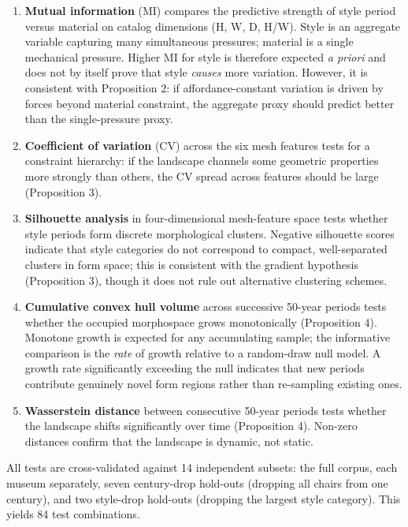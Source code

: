 \begin{enumerate}
\item \textbf{Mutual information} (MI) compares the predictive strength of style period versus material on catalog dimensions (H, W, D, H/W). Style is an aggregate variable capturing many simultaneous pressures; material is a single mechanical pressure. Higher MI for style is therefore expected \textit{a priori} and does not by itself prove that style \textit{causes} more variation. However, it is consistent with Proposition 2: if affordance-constant variation is driven by forces beyond material constraint, the aggregate proxy should predict better than the single-pressure proxy.

\item \textbf{Coefficient of variation} (CV) across the six mesh features tests for a constraint hierarchy: if the landscape channels some geometric properties more strongly than others, the CV spread across features should be large (Proposition 3).

\item \textbf{Silhouette analysis} in four-dimensional mesh-feature space tests whether style periods form discrete morphological clusters. Negative silhouette scores indicate that style categories do not correspond to compact, well-separated clusters in form space; this is consistent with the gradient hypothesis (Proposition 3), though it does not rule out alternative clustering schemes.

\item \textbf{Cumulative convex hull volume} across successive 50-year periods tests whether the occupied morphospace grows monotonically (Proposition 4). Monotone growth is expected for any accumulating sample; the informative comparison is the \textit{rate} of growth relative to a random-draw null model. A growth rate significantly exceeding the null indicates that new periods contribute genuinely novel form regions rather than re-sampling existing ones.

\item \textbf{Wasserstein distance} between consecutive 50-year periods tests whether the landscape shifts significantly over time (Proposition 4). Non-zero distances confirm that the landscape is dynamic, not static.
\end{enumerate}

All tests are cross-validated against 14 independent subsets: the full corpus, each museum separately, seven century-drop hold-outs (dropping all chairs from one century), and two style-drop hold-outs (dropping the largest style category). This yields 84 test combinations.

